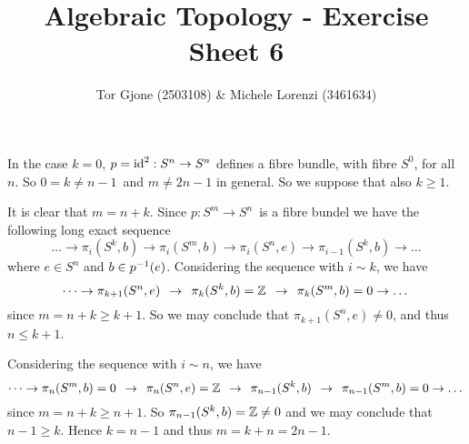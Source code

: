 \documentclass[a4paper,11pt,english]{article}
\title{\textbf{Algebraic Topology} - Exercise Sheet 6}
\author{Tor Gjone (2503108) \& Michele Lorenzi (3461634)}
\begin{document}
\mmaketitle

\begin{exercise}[1]
In the case $k = 0$, $p = \operatorname{id}^2: S^n \to S^n$ defines a fibre bundle, with fibre
$S^0$, for all $n$. So $0 = k \ne n-1$ and $m \ne 2n -1$ in general. 
So we suppose that also $k \ge 1$.


It is clear that $m = n+k$. Since $p: S^m \to S^n$ is a fibre bundel we have the
following long exact sequence
\[ \dots \to \pi_i(S^k,b) \to \pi_i(S^m,b) \to \pi_i(S^n,e) \to \pi_{i-1}(S^k, b) \to
\dots \]
where $e \in S^n$ and $b \in p^{-1}(e)$. 
Considering the sequence with $i \sim k$, we have
\[ \dots \to \pi_{k+1}(S^n,e) \:\:\to\:\: \pi_{k}(S^k, b) = \mathbb{Z} \:\:\to\:\: \pi_k(S^m,b) = 0 \to \dots \]
since $m = n+k \ge k+1$. So we may conclude that $\pi_{k+1}(S^n,e)\ne 0$, and
thus $n \le k+1$.

Considering the sequence with $i \sim n$, we have
\[ \dots \to \pi_n(S^m,b) = 0 \:\:\to\:\: \pi_n(S^n,e) = \mathbb{Z} \:\:\to\:\: \pi_{n-1}(S^k,b)
\:\:\to\:\: \pi_{n-1}(S^m,b) = 0 \to \dots \]
since $m = n+k \ge n+1$. So $\pi_{n-1}(S^k,b) = \mathbb{Z} \ne 0$ and we may conclude
that $n-1 \ge k$. Hence $k = n-1$ and thus $m = k+n = 2n-1$.




\end{exercise}
\end{document}
